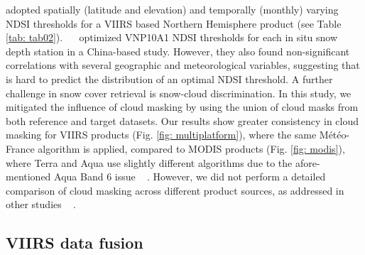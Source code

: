 \documentclass[tc, manuscript]{copernicus}
\providecommand{\DIFaddend}{} %
\begin{document}
{{\cite{schwaizer2020SnowCoverExtent} }\hspace{0pt}%
adopted spatially (latitude and elevation) and temporally (monthly) varying NDSI thresholds for a VIIRS based Northern Hemisphere product (see Table \ref{tab: tab02}). \mbox{%
\cite{zhang_comparative_2020} }\hspace{0pt}%
optimized VNP10A1 NDSI thresholds for each in situ snow depth station in a China-based study. However, they also found non-significant correlations with several geographic and meteorological variables, suggesting that is hard to predict the distribution of an optimal NDSI threshold. A further challenge in snow cover retrieval is snow-cloud discrimination. In this study, we mitigated the influence of cloud masking by using the union of cloud masks from both reference and target datasets. Our results show greater consistency in cloud masking for VIIRS products (Fig. \ref{fig: multiplatform}), where the same Météo-France algorithm is applied, compared to MODIS products (Fig. \ref{fig: modis}), where Terra and Aqua use slightly different algorithms due to the afore-mentioned Aqua Band 6 issue \mbox{%
\citep{riggs2021MODISAquaSnow}}\hspace{0pt}%
. However, we did not perform a detailed comparison of cloud masking across different product sources, as addressed in other studies \mbox{%
\citep{liu2022EffectCloudMask}}\hspace{0pt}%
.
}\DIFaddend 





\subsection{VIIRS data fusion}
\label{subsec: disc_multiplatform}
\end{document}
